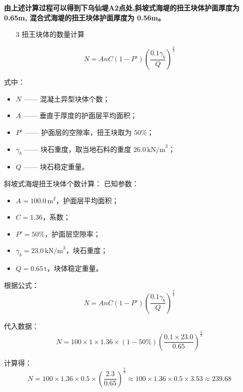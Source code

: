 \documentclass[UTF8, a4paper, 12pt]{ctexart} %
\begin{document}
\textbf{由上述计算过程可以得到下乌仙堤A2点处,斜坡式海堤的扭王块体护面厚度为
0.65m, 混合式海堤的扭王块体护面厚度为 0.56m。}

\begin{itemize}
    \item [3] 扭王块体的数量计算
\end{itemize}

\begin{equation}
    N = AnC (1 - P') \left( \frac{0.1 \gamma_b}{Q} \right)^{\frac{2}{3}}
\end{equation}

式中：
\begin{itemize}
    \item $N$ —— 混凝土异型块体个数；
    \item $A$ —— 垂直于厚度的护面层平均面积；
    \item $P'$ —— 护面层的空隙率，扭王块取为 $50\%$；
    \item $\gamma_b$ —— 块石重度，取当地石料的重度 $26.0\,\text{kN/m}^3$；
    \item $Q$ —— 块石稳定重量。
\end{itemize}

斜坡式海堤扭王块体个数计算：
已知参数：
\begin{itemize}
    \item $A = 100.0\,\text{m}^2$，护面层平均面积；
    \item $C = 1.36$，系数；
    \item $P' = 50\%$，护面层空隙率；
    \item $\gamma_b = 23.0\,\text{kN/m}^3$，块石重度；
    \item $Q = 0.65\,\text{t}$，块体稳定重量。
\end{itemize}

根据公式：
\begin{equation}
    N = A n C (1 - P') \left( \frac{0.1 \gamma_b}{Q} \right)^{\frac{2}{3}}
\end{equation}

代入数据：
\begin{equation}
    N = 100 \times 1 \times 1.36 \times (1 - 50\%) \left( \frac{0.1 \times 23.0}{0.65} \right)^{\frac{2}{3}}
\end{equation}

计算得：
\begin{equation}
    N = 100 \times 1.36 \times 0.5 \times \left( \frac{2.3}{0.65} \right)^{\frac{2}{3}} \approx 100 \times 1.36 \times 0.5 \times 3.53 \approx 239.68
\end{equation}
\end{document}
